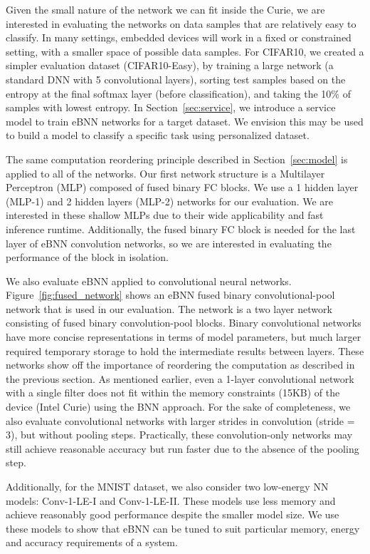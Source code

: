 \documentclass[10pt,emptycopyrightspace]{ewsn-proc}
\begin{document}
Given the small nature of the network we can fit inside the Curie, we are interested in evaluating the networks on data samples that are relatively easy to classify. In many settings, embedded devices will work in a fixed or constrained setting, with a smaller space of possible data samples. For CIFAR10, we created a simpler evaluation dataset (CIFAR10-Easy), by training a large network (a standard DNN with 5 convolutional layers), sorting test samples based on the entropy at the final softmax layer (before classification), and taking the 10\% of samples with lowest entropy.  In Section~\ref{sec:service}, we introduce a service model to train eBNN networks for a target dataset. We envision this may be used to build a model to classify a specific task using personalized dataset.

The same computation reordering principle described in Section~\ref{sec:model} is applied to all of the networks. Our first network structure is a Multilayer Perceptron (MLP) composed of fused binary FC blocks. We use a 1 hidden layer (MLP-1) and 2 hidden layers (MLP-2) networks for our evaluation. We are interested in these shallow MLPs due to their wide applicability and fast inference runtime. Additionally, the fused binary FC block is needed for the last layer of eBNN convolution networks, so we are interested in evaluating the performance of the block in isolation.

We also evaluate eBNN applied to convolutional neural networks. Figure~\ref{fig:fused_network} shows an eBNN fused binary convolutional-pool network that is used in our evaluation. The network is a two layer network consisting of fused binary convolution-pool blocks. Binary convolutional networks have more concise representations in terms of model parameters, but much larger required temporary storage to hold the intermediate results between layers. These networks show off the importance of reordering the computation as described in the previous section. As mentioned earlier, even a 1-layer convolutional network with a single filter does not fit within the memory constraints (15KB) of the device (Intel Curie) using the BNN approach. For the sake of completeness, we also evaluate convolutional networks with larger strides in convolution (stride = 3), but without pooling steps. Practically, these convolution-only networks may still achieve reasonable accuracy but run faster due to the absence of the pooling step.

Additionally, for the MNIST dataset, we also consider two low-energy NN models: Conv-1-LE-I and Conv-1-LE-II. These models use less memory and achieve reasonably good performance despite the smaller model size. We use these models to show that eBNN can be tuned to suit particular memory, energy and accuracy requirements of a system.
\end{document}
